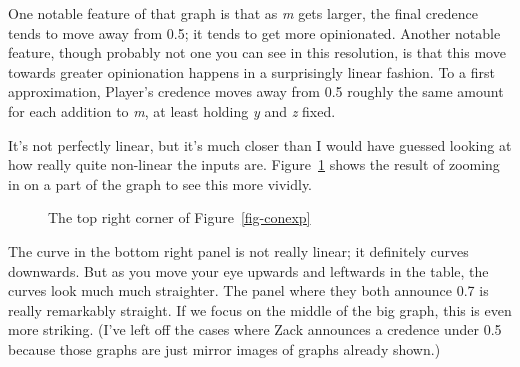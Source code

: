\documentclass[
  10pt,
  letterpaper,
  DIV=11,
  numbers=noendperiod,
  twoside]{scrartcl}
\begin{document}
One notable feature of that graph is that as \emph{m} gets larger, the
final credence tends to move away from 0.5; it tends to get more
opinionated. Another notable feature, though probably not one you can
see in this resolution, is that this move towards greater opinionation
happens in a surprisingly linear fashion. To a first approximation,
Player's credence moves away from 0.5 roughly the same amount for each
addition to \emph{m}, at least holding \emph{y} and \emph{z} fixed.

It's not perfectly linear, but it's much closer than I would have
guessed looking at how really quite non-linear the inputs are.
Figure~\ref{fig-cap-top-right} shows the result of zooming in on a part
of the graph to see this more vividly.

\begin{figure}


\caption{\label{fig-cap-top-right}The top right corner of
Figure~\ref{fig-conexp}}

\end{figure}%

The curve in the bottom right panel is not really linear; it definitely
curves downwards. But as you move your eye upwards and leftwards in the
table, the curves look much much straighter. The panel where they both
announce 0.7 is really remarkably straight. If we focus on the middle of
the big graph, this is even more striking. (I've left off the cases
where Zack announces a credence under 0.5 because those graphs are just
mirror images of graphs already shown.)
\end{document}
